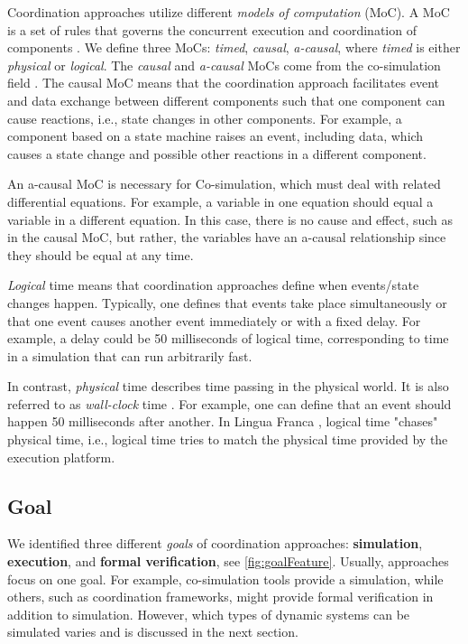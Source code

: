 \documentclass[runningheads]{llncs}
\begin{document}
Coordination approaches utilize different \textit{models of computation} (MoC).
A MoC is a set of rules that governs the concurrent execution and coordination of components \cite{ptolemaeusSystemDesignModeling2014}.
We define three MoCs: \textit{timed}, \textit{causal}, \textit{a-causal}, where \textit{timed} is either \textit{physical} or \textit{logical}.
The \textit{causal} and \textit{a-causal} MoCs come from the co-simulation field \cite{gomesCoSimulationSurvey2019}.
The causal MoC means that the coordination approach facilitates event and data exchange between different components such that one component can cause reactions, i.e., state changes in other components.
For example, a component based on a state machine raises an event, including data, which causes a state change and possible other reactions in a different component.

An a-causal MoC is necessary for Co-simulation, which must deal with related differential equations.
For example, a variable in one equation should equal a variable in a different equation.
In this case, there is no cause and effect, such as in the causal MoC, but rather, the variables have an a-causal relationship since they should be equal at any time.

\textit{Logical} time means that coordination approaches define when events/state changes happen.
Typically, one defines that events take place simultaneously or that one event causes another event immediately or with a fixed delay.
For example, a delay could be 50 milliseconds of logical time, corresponding to time in a simulation that can run arbitrarily fast.

In contrast, \textit{physical} time describes time passing in the physical world.
It is also referred to as \textit{wall-clock} time \cite{gomesCoSimulationSurvey2019}.
For example, one can define that an event should happen 50 milliseconds after another.
In Lingua Franca \cite{lohstrohReactorsDeterministicModel2020}, logical time "chases" physical time, i.e., logical time tries to match the physical time provided by the execution platform.


\subsection{Goal} %
We identified three different \textit{goals} of coordination approaches: \textbf{simulation}, \textbf{execution}, and \textbf{formal verification}, see \autoref{fig:goalFeature}.
Usually, approaches focus on one goal.
For example, co-simulation tools provide a simulation, while others, such as coordination frameworks, might provide formal verification in addition to simulation.
However, which types of dynamic systems can be simulated varies and is discussed in the next section.
\end{document}
